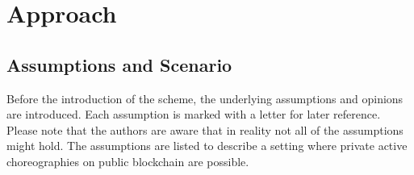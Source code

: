 \documentclass[runningheads]{llncs}
\begin{document}
\section{Approach} \label{sec:approach}

\subsection{Assumptions and Scenario} \label{subsec:assumptions}

Before the introduction of the scheme, the underlying assumptions and opinions are introduced. Each assumption is marked with a letter for later reference. Please note that the authors are aware that in reality not all of the assumptions might hold. The assumptions are listed to describe a setting where private active choreographies on public blockchain are possible.
\end{document}
